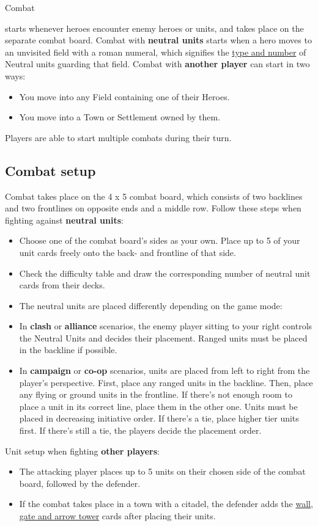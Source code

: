 \hypertarget{Combat}{Combat} starts whenever heroes encounter enemy heroes or units, and takes place on the separate combat board.
Combat with \textbf{neutral units} starts when a hero moves to an unvisited field with a roman numeral, which signifies the \hyperlink{Difficulty}{type and number} of Neutral units guarding that field.
Combat with \textbf{another player} can start in two ways:
\begin{itemize}
  \item You move into any Field containing one of their Heroes.
  \item You move into a Town or Settlement owned by them.
\end{itemize}
Players are able to start multiple combats during their turn.

\subsection*{\hypertarget{Combatsetup}{Combat setup}}

Combat takes place on the 4 x 5 combat board, which consists of two backlines and two frontlines on opposite ends and a middle row.
Follow these steps when fighting against \textbf{neutral units}:

\begin{itemize}
  \item Choose one of the combat board’s sides as your own.
Place up to 5 of your unit cards freely onto the back- and frontline of that side.
  \item Check the difficulty table and draw the corresponding number of neutral unit cards from their decks.
  \item The neutral units are placed differently depending on the game mode:
  \item In \textbf{clash} or \textbf{alliance} scenarios, the enemy player sitting to your right controls the Neutral Units and decides their placement.
Ranged units must be placed in the backline if possible.
  \item In \textbf{campaign} or \textbf{co-op} scenarios, units are placed from left to right from the player's perspective.
First, place any ranged units in the backline.
Then, place any flying or ground units in the frontline.
If there's not enough room to place a unit in its correct line, place them in the other one.
Units must be placed in decreasing initiative order.
If there's a tie, place higher tier units first.
If there's still a tie, the players decide the placement order.
\end{itemize}
Unit setup when fighting \textbf{other players}:
\begin{itemize}[wide]
  \item The attacking player places up to 5 units on their chosen side of the combat board, followed by the defender.
  \item If the combat takes place in a town with a citadel, the defender adds the \hyperlink{Walls}{wall, gate and arrow tower} cards after placing their units.
\end{itemize}

